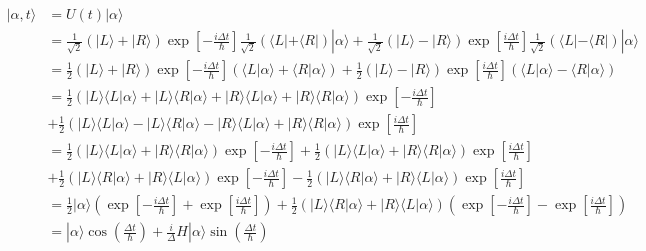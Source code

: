 \documentclass[a4paper]{article}
\begin{document}
\begin{answer}
    \begin{align*}
        |\alpha,t\rangle &= U(t)|\alpha\rangle \\
        &= \frac{1}{\sqrt{2}}(|L \rangle + |R\rangle) \exp{\left[-\frac{i\Delta t}{\hbar}\right]} \frac{1}{\sqrt{2}}(\langle L| + \langle R|)|\alpha\rangle + \frac{1}{\sqrt{2}}(|L \rangle - |R\rangle) \exp{\left[\frac{i\Delta t}{\hbar}\right]} \frac{1}{\sqrt{2}}(\langle L| - \langle R|)|\alpha\rangle\\
        &= \frac{1}{2}(|L \rangle + |R\rangle) \exp{\left[-\frac{i\Delta t}{\hbar}\right]} (\langle L|\alpha\rangle + \langle R|\alpha\rangle) + \frac{1}{2}(|L \rangle - |R\rangle) \exp{\left[\frac{i\Delta t}{\hbar}\right]} (\langle L|\alpha\rangle - \langle R|\alpha\rangle)\\
        &= \frac{1}{2}(|L \rangle \langle L | \alpha \rangle + |L \rangle \langle R | \alpha \rangle + |R \rangle \langle L | \alpha \rangle + |R \rangle \langle R | \alpha \rangle) \exp{\left[-\frac{i\Delta t}{\hbar}\right]} \\
        &+ \frac{1}{2}(|L \rangle \langle L | \alpha \rangle - |L \rangle \langle R | \alpha \rangle - |R \rangle \langle L | \alpha \rangle + |R \rangle \langle R | \alpha \rangle) \exp{\left[\frac{i\Delta t}{\hbar}\right]} \\
        &= \frac{1}{2}(|L \rangle \langle L | \alpha \rangle + |R \rangle \langle R | \alpha \rangle) \exp{\left[-\frac{i\Delta t}{\hbar}\right]} + \frac{1}{2}(|L \rangle \langle L | \alpha \rangle + |R \rangle \langle R | \alpha \rangle) \exp{\left[\frac{i\Delta t}{\hbar}\right]} \\
        &+ \frac{1}{2}(|L \rangle \langle R | \alpha \rangle + |R \rangle \langle L | \alpha \rangle) \exp{\left[-\frac{i\Delta t}{\hbar}\right]} - \frac{1}{2}(|L \rangle \langle R | \alpha \rangle + |R \rangle \langle L | \alpha \rangle) \exp{\left[\frac{i\Delta t}{\hbar}\right]} \\
        &= \frac{1}{2}|\alpha\rangle\left(
            \exp{\left[-\frac{i\Delta t}{\hbar}\right]} + \exp{\left[\frac{i\Delta t}{\hbar}\right]}
        \right) + \frac{1}{2}(|L \rangle \langle R | \alpha \rangle + |R \rangle \langle L | \alpha \rangle) \left(
            \exp{\left[-\frac{i\Delta t}{\hbar}\right]} - \exp{\left[\frac{i\Delta t}{\hbar}\right]} \right)\\
        &= |\alpha\rangle \cos{\left(\frac{\Delta t}{\hbar}\right)} + \frac{i}{\Delta}H |\alpha\rangle \sin{\left(\frac{\Delta t}{\hbar}\right)}\\
    \end{align*}
    \end{answer}
\end{document}
